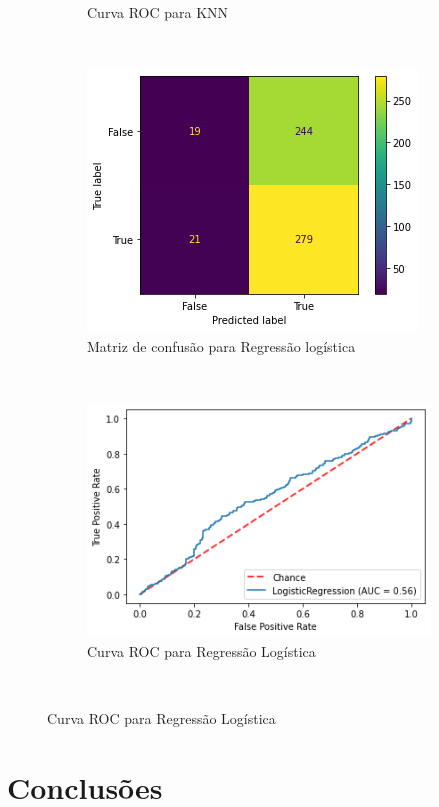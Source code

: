 \begin{figure}[htb]
\begin{subfigure}[b]{0.45\textwidth}
        \caption{Curva ROC para KNN}
        \label{fig:resultados:base-de-dados-28.3.6-roc-curve-knn-total-cnae}
    \end{subfigure} ~ \\
    \centering 
    \begin{subfigure}[b]{0.45\textwidth}
        \includegraphics[scale=0.45]{images/base-de-dados-28.4.7-confusion-matrix-logregression-total-cnae.png}
        \caption{Matriz de confusão para Regressão logística}
        \label{fig:resultados:base-de-dados-28.3.7-confusion-matrix-logregression-total-cnae}
    \end{subfigure} ~ \quad
    \begin{subfigure}[b]{0.45\textwidth}
        \includegraphics[scale=0.45]{images/base-de-dados-28.4.8-roc-curve-logregression-total-cnae.png}
        \caption{Curva ROC para Regressão Logística}
        \label{fig:resultados:base-de-dados-28.3.8-roc-curve-logregression-total-cnae}
    \end{subfigure} ~ \\
    \fdadospesquisa
\end{figure}

\section{Conclusões}
\label{section:resultados:conclusoes}
